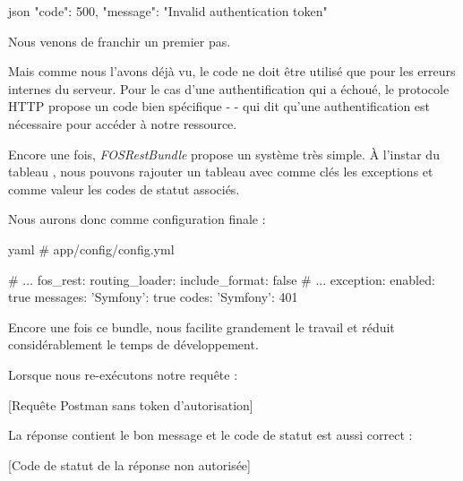 \documentclass[big]{zmdocument}
\begin{document}
\begin{CodeBlock}{json}
{
  "code": 500,
  "message": "Invalid authentication token"
}
\end{CodeBlock}



Nous venons de franchir un premier pas.



Mais comme nous l'avons déjà vu, le code  ne doit être utilisé que pour les erreurs internes du serveur.
Pour le cas d'une authentification qui a échoué, le protocole HTTP propose un code bien spécifique -  - qui dit qu'une authentification est nécessaire pour accéder à notre ressource.



Encore une fois, \textit{FOSRestBundle} propose un système très simple. À l'instar du tableau , nous pouvons rajouter un tableau  avec comme clés les exceptions et comme valeur les codes de statut associés.



Nous aurons donc comme configuration finale :



\begin{CodeBlock}{yaml}
# app/config/config.yml

# ...
fos_rest:
    routing_loader:
        include_format: false
    # ...
    exception:
        enabled: true
        messages:
            'Symfony\Component\Security\Core\Exception\BadCredentialsException': true
        codes:
            'Symfony\Component\Security\Core\Exception\BadCredentialsException': 401
\end{CodeBlock}



Encore une fois ce bundle, nous facilite grandement le travail et réduit considérablement le temps de développement.



Lorsque nous re-exécutons notre requête :



[Requête Postman sans token d'autorisation]


La réponse contient le bon message et le code de statut est aussi correct :



[Code de statut de la réponse non autorisée]
\end{document}
